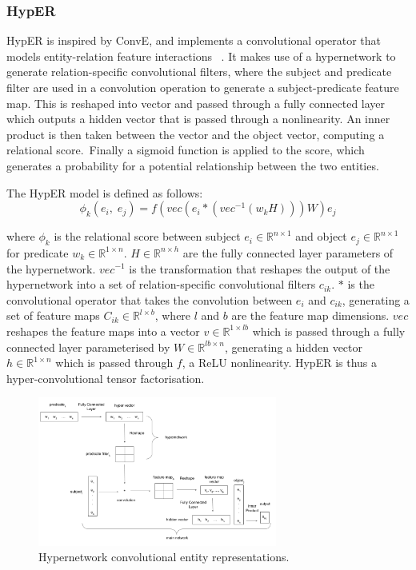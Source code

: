 \subsubsection{HypER}

\noindent HypER is inspired by ConvE, and implements a convolutional operator that models entity-relation feature interactions \unskip ~\citep{balazevic2019hypernetwork}. It makes use of a hypernetwork to generate relation-specific convolutional filters, where the subject and predicate filter are used in a convolution operation to generate a subject-predicate feature map. This is reshaped into vector and passed through a fully connected layer which outputs a hidden vector that is passed through a nonlinearity. An inner product is then taken between the vector and the object vector, computing a relational score.\ Finally a sigmoid function is applied to the score, which generates a probability for a potential relationship between the two entities. \par

\noindent The HypER model is defined as follows: 
\begin{equation}
	\phi_k(e_i, \; e_j) = f(vec(e_i * (vec^{-1}(w_kH)))W)e_j
\end{equation}

\noindent where $ \phi_k $ is the relational score between subject $ e_i \in \mathbb{R}^{n \times 1} $ and object $ e_j \in \mathbb{R}^{n \times 1} $ for predicate $ w_k \in \mathbb{R}^{1 \times n} $. $ H \in \mathbb{R}^{n \times h} $ are the fully connected layer parameters of the hypernetwork. $ vec^{-1} $ is the transformation that reshapes the output of the hypernetwork into a set of relation-specific convolutional filters $ c_{ik} $. $ * $ is the convolutional operator that takes the convolution between $ e_i $ and $ c_{ik} $, generating a set of feature maps $ C_{ik} \in \mathbb{R}^{l \times b} $, where $ l $ and $ b $ are the feature map dimensions. $ vec $ reshapes the feature maps into a vector $ v \in \mathbb{R}^{1 \times lb} $ which is passed through a fully connected layer parameterised by $ W \in \mathbb{R}^{lb \times n} $, generating a hidden vector $ h \in \mathbb{R}^{1 \times n} $ which is passed through $ f $, a ReLU nonlinearity. HypER is thus a hyper-convolutional tensor factorisation. 

\begin{figure}[H]
   	\centering
    	\includegraphics[width=0.7\textwidth, height=0.5\textwidth]{hyper_neural_tensor_network_final}
	\caption{Hypernetwork convolutional entity representations.}
\end{figure}

